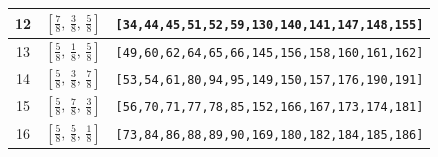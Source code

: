 \documentclass[fleqn,8pt]{jsarticle}
\begin{document}
\begin{longtable}{ccc}
12 & $\left[ \frac{7}{8},\, \frac{3}{8},\, \frac{5}{8} \right]$ & {\tt [34,44,45,51,52,59,130,140,141,147,148,155]} \\ \hline
13 & $\left[ \frac{5}{8},\, \frac{1}{8},\, \frac{5}{8} \right]$ & {\tt [49,60,62,64,65,66,145,156,158,160,161,162]} \\ \hline
14 & $\left[ \frac{5}{8},\, \frac{3}{8},\, \frac{7}{8} \right]$ & {\tt [53,54,61,80,94,95,149,150,157,176,190,191]} \\ \hline
15 & $\left[ \frac{5}{8},\, \frac{7}{8},\, \frac{3}{8} \right]$ & {\tt [56,70,71,77,78,85,152,166,167,173,174,181]} \\ \hline
16 & $\left[ \frac{5}{8},\, \frac{5}{8},\, \frac{1}{8} \right]$ & {\tt [73,84,86,88,89,90,169,180,182,184,185,186]} \\
\end{longtable}
\renewcommand{\arraystretch}{1.2}
\end{document}
